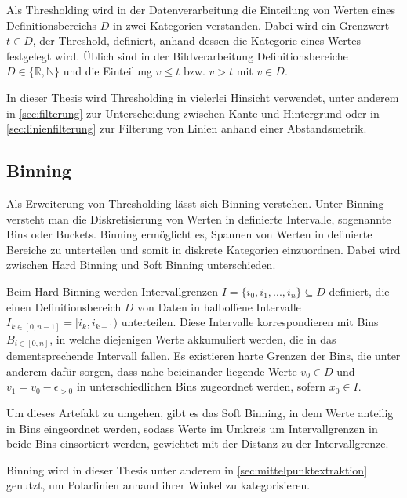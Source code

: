 Als Thresholding wird in der Datenverarbeitung die Einteilung von Werten eines Definitionsbereichs $D$ in zwei Kategorien verstanden. Dabei wird ein Grenzwert $t \in D$, der Threshold, definiert, anhand dessen die Kategorie eines Wertes festgelegt wird. Üblich sind in der Bildverarbeitung Definitionsbereiche $D \in \{\mathbb{R}, \mathbb{N}\}$ und die Einteilung $v \leq t$ bzw. $v > t$ mit $v \in D$.

In dieser Thesis wird Thresholding in vielerlei Hinsicht verwendet, unter anderem in \autoref{sec:filterung} zur Unterscheidung zwischen Kante und Hintergrund oder in \autoref{sec:linienfilterung} zur Filterung von Linien anhand einer Abstandsmetrik.

\subsection{Binning}
\label{sec:binning}

Als Erweiterung von Thresholding lässt sich Binning verstehen. Unter Binning versteht man die Diskretisierung von Werten in definierte Intervalle, sogenannte Bins oder Buckets. Binning ermöglicht es, Spannen von Werten in definierte Bereiche zu unterteilen und somit in diskrete Kategorien einzuordnen. Dabei wird zwischen Hard Binning und Soft Binning unterschieden.

Beim Hard Binning werden Intervallgrenzen $I = \{i_0, i_1, ..., i_n\} \subseteq D$ definiert, die einen Definitionsbereich $D$ von Daten in halboffene Intervalle $I_{k \in [0, n-1]} = [i_k, i_{k+1})$ unterteilen. Diese Intervalle korrespondieren mit Bins $B_{i \in [0, n]}$, in welche diejenigen Werte akkumuliert werden, die in das dementsprechende Intervall fallen. Es existieren harte Grenzen der Bins, die unter anderem dafür sorgen, dass nahe beieinander liegende Werte $v_0 \in D$ und $v_1 = v_0 - \epsilon_{>0}$ in unterschiedlichen Bins zugeordnet werden, sofern $x_0 \in I$.

Um dieses Artefakt zu umgehen, gibt es das Soft Binning, in dem Werte anteilig in Bins eingeordnet werden, sodass Werte im Umkreis um Intervallgrenzen in beide Bins einsortiert werden, gewichtet mit der Distanz zu der Intervallgrenze.

Binning wird in dieser Thesis unter anderem in \autoref{sec:mittelpunktextraktion} genutzt, um Polarlinien anhand ihrer Winkel zu kategorisieren.


